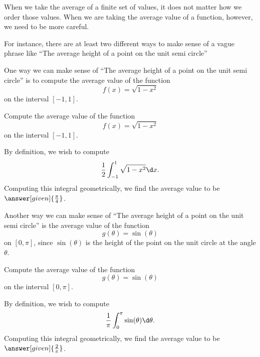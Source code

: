 \documentclass{ximera}
\begin{document}
When we take the average of a finite set of values, it does not matter
how we order those values.  When we are taking the average value of a
function, however, we need to be more careful.

For instance, there are at least two different ways to make sense of a
vague phrase like ``The average height of a point on the unit semi
circle''
\begin{image}
\end{image}
One way we can make sense of ``The average height of a point on the
unit semi circle'' is to compute the average value of the function
\[
f(x) =\sqrt{1-x^2}
\]
on the interval $[-1,1]$.

\begin{example}
  Compute the average value of the function
  \[
  f(x) =\sqrt{1-x^2}
  \]
  on the interval $[-1,1]$.
  \begin{explanation}
    By definition, we wish to compute
    \[
    \frac{1}{2}\int_{-1}^1 \sqrt{1-x^2} \d x.
    \]
    Computing this integral geometrically, we find the average value
    to be $\answer[given]{\frac{\pi}{4}}$.
  \end{explanation}
\end{example}
Another way we can make sense of ``The average height of a point on the
unit semi circle'' is the average value of the function
\[
g(\theta) =\sin(\theta)
\]
on $[0,\pi]$, since $\sin(\theta)$ is the height of the point on the
unit circle at the angle $\theta$.
\begin{example}
  Compute the average value of the function
  \[
  g(\theta) =\sin(\theta)
  \]
  on the interval $[0,\pi]$.
  \begin{explanation}
    By definition, we wish to compute
    \[
    \frac{1}{\pi} \int_0^\pi\sin(\theta) \d \theta.
    \]
    Computing this integral geometrically, we find the average value
    to be $\answer[given]{\frac{2}{\pi}}$.
  \end{explanation}
\end{example}
\end{document}
